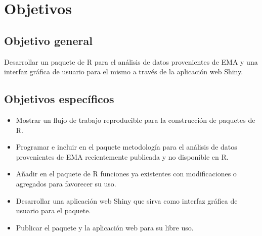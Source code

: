 \chapter{Objetivos}

\section{Objetivo general}
 
Desarrollar un paquete de R para el análisis de datos provenientes de EMA y una interfaz gráfica de usuario para el mismo a través de la aplicación web Shiny.


\section{Objetivos específicos}
\begin{itemize}
\item Mostrar un flujo de trabajo reproducible para la construcción de paquetes de R.
\item Programar e incluir en el paquete metodología para el análisis de datos provenientes de EMA recientemente publicada y no disponible en R.
\item Añadir en el paquete de R funciones ya existentes con modificaciones o agregados para favorecer su uso.
\item Desarrollar una aplicación web Shiny que sirva como interfaz gráfica de usuario para el paquete.
\item Publicar el paquete y la aplicación web para su libre uso.
\end{itemize}

